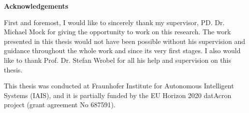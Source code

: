 

	\thispagestyle{empty}
{\noindent%
	\huge{\textbf{\textsf{Acknowledgements}}}
}
\vspace{2cm}
\begin{flushleft}
	\noindent%


\par First and foremost, I would like to sincerely thank my supervisor, PD. Dr. Michael Mock for giving the opportunity to work on this research. The work presented in this thesis would not have been possible without his supervision and guidance throughout the whole work and since its very first stages. I also would like to thank Prof. Dr. Stefan Wrobel for all his help and supervision on this thesis. 
\par This thesis was conducted at Fraunhofer Institute for Autonomous Intelligent Systems (IAIS), and it is partially funded by the EU Horizon 2020 datAcron project (grant agreement No 687591).

	
	
\end{flushleft}
